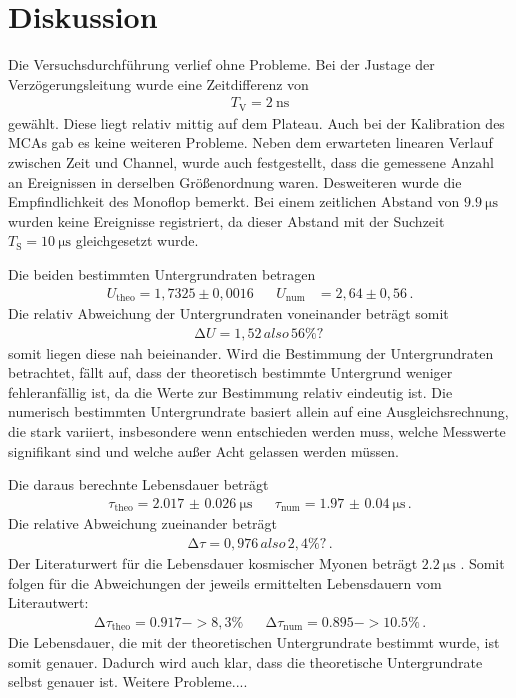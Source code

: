 \section{Diskussion}
\label{sec:Diskussion}
Die Versuchsdurchführung verlief ohne Probleme.
Bei der Justage der Verzögerungsleitung wurde eine Zeitdifferenz von
\begin{align*}
    T_\text{V} = \SI{2}{\nano\second}
\end{align*}
gewählt.
Diese liegt relativ mittig auf dem Plateau.
Auch bei der Kalibration des MCAs gab es keine weiteren Probleme.
Neben dem erwarteten linearen Verlauf zwischen Zeit und Channel, wurde auch festgestellt, dass die gemessene Anzahl an Ereignissen in derselben Größenordnung waren.
Desweiteren wurde die Empfindlichkeit des Monoflop bemerkt.
Bei einem zeitlichen Abstand von $\SI{9.9}{\micro\second}$ wurden keine Ereignisse registriert, da dieser Abstand mit der Suchzeit $T_\text{S} = \SI{10}{\micro\second}$ gleichgesetzt wurde.

\noindent
Die beiden bestimmten Untergrundraten betragen
\begin{align*}
    U_\text{theo} = 1,7325 \pm 0,0016 &&       U_\text{num} &= 2,64 \pm 0,56 \, .
\end{align*}
Die relativ Abweichung der Untergrundraten voneinander beträgt somit
\begin{align*}
    \increment U = 1,52 \, also \, 56\% ? \, 
\end{align*} %
somit liegen diese nah beieinander.
Wird die Bestimmung der Untergrundraten betrachtet, fällt auf, dass der theoretisch bestimmte Untergrund weniger fehleranfällig ist, da die Werte zur Bestimmung relativ eindeutig ist.
Die numerisch bestimmten Untergrundrate basiert allein auf eine Ausgleichsrechnung, die stark variiert, insbesondere wenn entschieden werden muss, welche Messwerte signifikant sind und welche außer Acht gelassen werden müssen.

\noindent
Die daraus berechnte Lebensdauer beträgt
\begin{align*}
    \tau_\text{theo} = \SI{2.017(26)}{\micro\second} && \tau_\text{num} = \SI{1.97(4)}{\micro\second} \, .
\end{align*}
Die relative Abweichung zueinander beträgt
\begin{align*}
    \increment \tau = 0,976 \, also \, 2,4\% ? \, .
\end{align*}%
Der Literaturwert für die Lebensdauer kosmischer Myonen beträgt $\SI{2.2}{\micro\second}$ \cite{pdg}.
Somit folgen für die Abweichungen der jeweils ermittelten Lebensdauern vom Literautwert:
\begin{align*}
    \increment \tau_\text{theo} = 0.917 -> 8,3\% && \increment \tau_\text{num} = 0.895 -> 10.5\% \, .
\end{align*}
Die Lebensdauer, die mit der theoretischen Untergrundrate bestimmt wurde, ist somit genauer.
Dadurch wird auch klar, dass die theoretische Untergrundrate selbst genauer ist.
Weitere Probleme....